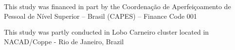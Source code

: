 This study was financed in part by the Coordenação de Aperfeiçoamento de Pessoal de Nível Superior – Brasil (CAPES) – Finance Code 001

This study was partly conducted in Lobo Carneiro cluster located in NACAD/Coppe - Rio de Janeiro, Brazil